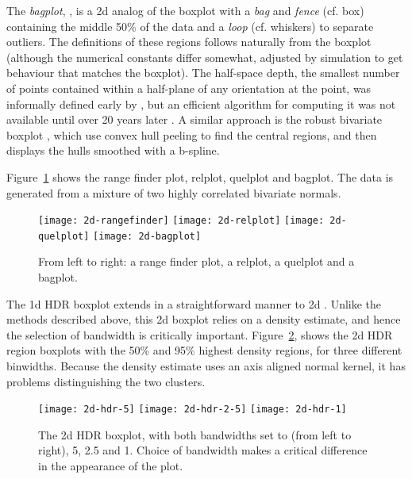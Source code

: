 \documentclass[oneside]{article}
\begin{document}
The \emph{bagplot}, \citep{rousseuw:1999}, is a 2d analog of the boxplot with a \emph{bag} and \emph{fence} (cf. box) containing the middle 50\% of the data and a \emph{loop} (cf. whiskers) to separate outliers. The definitions of these regions follows naturally from the boxplot (although the numerical constants differ somewhat, adjusted by simulation to get behaviour that matches the boxplot). The half-space depth, the smallest number of points contained within a half-plane of any orientation at the point, was informally defined early by \citet{tukey:1975}, but an efficient algorithm for computing it was not available until over 20 years later \citep{rousseeuw:1996}.  A similar approach is the robust bivariate boxplot \citep{zani:1998}, which use convex hull peeling to find the central regions, and then displays the hulls smoothed with a b-spline.

Figure~\ref{fig:2d} shows the range finder plot, relplot, quelplot and bagplot. The data is generated from a mixture of two highly correlated bivariate normals.

\begin{figure}[htbp]
  \centering
  \texttt{[image: 2d-rangefinder]}%
  \texttt{[image: 2d-relplot]}%
  \texttt{[image: 2d-quelplot]}%
  \texttt{[image: 2d-bagplot]}
  \caption{From left to right: a range finder plot, a relplot, a quelplot and a bagplot.}
  \label{fig:2d}
\end{figure}

The 1d HDR boxplot extends in a straightforward manner to 2d \citep{hyndman:1996a}. Unlike the methods described above, this 2d boxplot relies on a density estimate, and hence the selection of bandwidth is critically important. Figure~\ref{fig:2d-hdr}, shows the 2d HDR region boxplots with the 50\% and 95\% highest density regions, for three different binwidths. Because the density estimate uses an axis aligned normal kernel, it has problems distinguishing the two clusters.

\begin{figure}[htbp]
  \centering
  \texttt{[image: 2d-hdr-5]}%
  \texttt{[image: 2d-hdr-2-5]}%
  \texttt{[image: 2d-hdr-1]}
  \caption{The 2d HDR boxplot, with both bandwidths set to (from left to right), 5, 2.5 and 1. Choice of bandwidth makes a critical difference in the appearance of the plot.}
  \label{fig:2d-hdr}
\end{figure}
\end{document}
